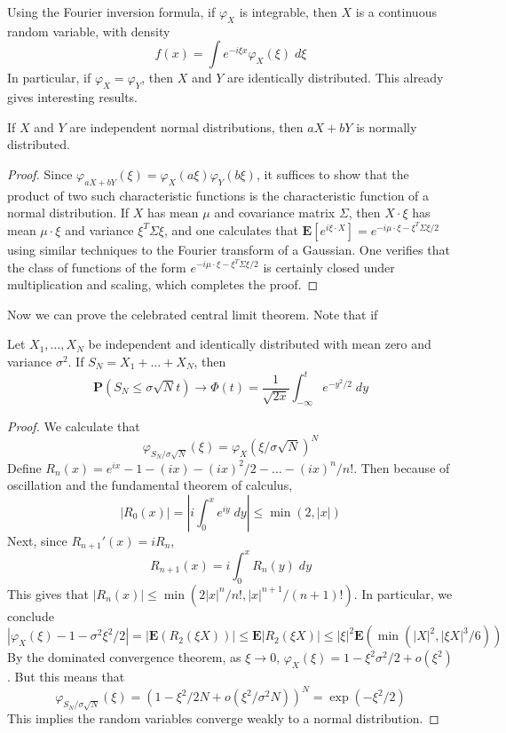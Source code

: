 Using the Fourier inversion formula, if $\varphi_X$ is integrable, then $X$ is a continuous random variable, with density
%
\[ f(x) = \int e^{- i \xi x} \varphi_X(\xi)\; d\xi \]
%
In particular, if $\varphi_X = \varphi_Y$, then $X$ and $Y$ are identically distributed. This already gives interesting results.

\begin{theorem}
    If $X$ and $Y$ are independent normal distributions, then $aX + bY$ is normally distributed.
\end{theorem}
\begin{proof}
    Since $\varphi_{aX+bY}(\xi) = \varphi_X(a \xi) \varphi_Y(b \xi)$, it suffices to show that the product of two such characteristic functions is the characteristic function of a normal distribution. If $X$ has mean $\mu$ and covariance matrix $\Sigma$, then $X \cdot \xi$ has mean $\mu \cdot \xi$ and variance $\xi^T \Sigma \xi$, and one calculates that $\mathbf{E}[e^{i \xi \cdot X}] = e^{- i \mu \cdot \xi - \xi^T \Sigma \xi / 2}$ using similar techniques to the Fourier transform of a Gaussian. One verifies that the class of functions of the form $e^{-i \mu \cdot \xi - \xi^T \Sigma \xi / 2}$ is certainly closed under multiplication and scaling, which completes the proof. 
\end{proof}

Now we can prove the celebrated central limit theorem. Note that if

\begin{theorem}
    Let $X_1, \dots, X_N$ be independent and identically distributed with mean zero and variance $\sigma^2$. If $S_N = X_1 + \dots + X_N$, then
    \[ \mathbf{P}(S_N \leq \sigma \sqrt{N} t) \to \Phi(t) = \frac{1}{\sqrt{2x}} \int_{-\infty}^t e^{-y^2/2}\; dy \]
\end{theorem}
\begin{proof}
    We calculate that
    \[ \varphi_{S_N/\sigma \sqrt{N}}(\xi) = \varphi_X(\xi/\sigma \sqrt{N})^N \]
    Define $R_n(x) = e^{ix} - 1 - (ix) - (ix)^2/2 - \dots - (ix)^n/n!$. Then because of oscillation and the fundamental theorem of calculus,
    \[ |R_0(x)| = \left| i \int_0^x e^{iy}\; dy \right| \leq \min(2,|x|) \]
    Next, since $R_{n+1}'(x) = i R_n$,
    \[ R_{n+1}(x) = i  \int_0^x R_n(y)\; dy \]
    This gives that $|R_n(x)| \leq \min(2|x|^n/n!,|x|^{n+1}/(n+1)!)$. In particular, we conclude
    \[ |\varphi_X(\xi) - 1 - \sigma^2 \xi^2/2| = |\mathbf{E}(R_2(\xi X))| \leq \mathbf{E}|R_2(\xi X)| \leq |\xi|^2 \mathbf{E} \left( \min \left( |X|^2, |\xi X|^3/6 \right) \right) \]
    By the dominated convergence theorem, as $\xi \to 0$, $\varphi_X(\xi) = 1 - \xi^2 \sigma^2/2 + o(\xi^2)$. But this means that
    \[ \varphi_{S_N/\sigma \sqrt{N}}(\xi) = (1 - \xi^2 / 2 N + o(\xi^2/\sigma^2 N))^N = \exp(-\xi^2/2) \]
    This implies the random variables converge weakly to a normal distribution.
\end{proof}


